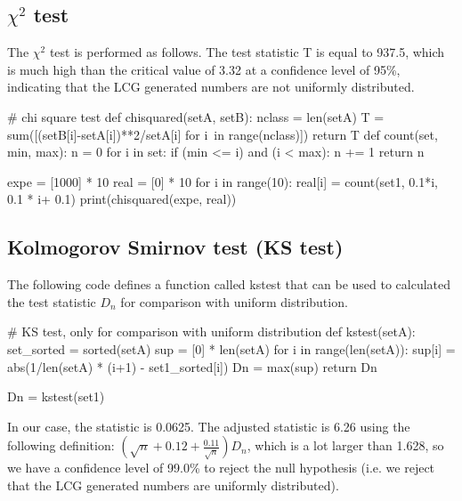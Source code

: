 \subsection*{$\chi^2$ test}
The $\chi^2$ test is performed as follows. The test statistic T is equal to 937.5, which is much high than the critical value of 3.32 at a confidence level of 95\%, indicating that the LCG generated numbers are not uniformly distributed. 
\begin{python}
# chi square test
def chisquared(setA, setB):
    nclass = len(setA)
    T = sum([(setB[i]-setA[i])**2/setA[i] for i\
             in range(nclass)])
    return T
def count(set, min, max):
    n = 0
    for i in set:
        if (min <= i) and (i < max):
            n += 1
    return n  

expe = [1000] * 10
real = [0] * 10
for i in range(10):
    real[i] =  count(set1, 0.1*i, 0.1 * i+ 0.1)    
print(chisquared(expe, real))
\end{python}

\subsection*{Kolmogorov Smirnov test (KS test)}
The following code defines a function called kstest that can be used to calculated the test statistic $D_n$ for comparison with uniform distribution. 
\begin{python}
# KS test, only for comparison with uniform distribution
def kstest(setA):
    set_sorted = sorted(setA)
    sup = [0] * len(setA)
    for i in range(len(setA)):
        sup[i] = abs(1/len(setA) * (i+1) - set1_sorted[i])
    Dn = max(sup)
    return Dn
    
Dn = kstest(set1)
\end{python}
In our case, the statistic is 0.0625. The adjusted statistic is 6.26 using the following definition: $\left(\sqrt{n}+0.12+\frac{0.11}{\sqrt{n}}\right) D_{n}$, which is a lot larger than 1.628, so we have a confidence level of 99.0\% to reject the null hypothesis (i.e. we reject that the LCG generated numbers are uniformly distributed).

